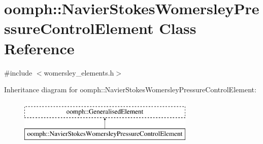 \hypertarget{classoomph_1_1NavierStokesWomersleyPressureControlElement}{}\section{oomph\+:\+:Navier\+Stokes\+Womersley\+Pressure\+Control\+Element Class Reference}
\label{classoomph_1_1NavierStokesWomersleyPressureControlElement}


{\ttfamily \#include $<$womersley\+\_\+elements.\+h$>$}

Inheritance diagram for oomph\+:\+:Navier\+Stokes\+Womersley\+Pressure\+Control\+Element\+:\begin{figure}[H]
\begin{center}
\leavevmode
\includegraphics[height=2.000000cm]{classoomph_1_1NavierStokesWomersleyPressureControlElement}
\end{center}
\end{figure}
